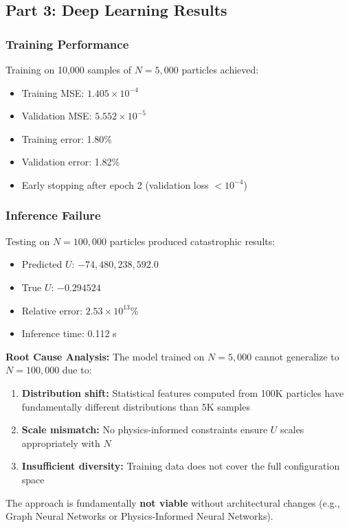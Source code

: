 \documentclass[11pt,a4paper]{article}
\begin{document}
\subsection{Part 3: Deep Learning Results}

\subsubsection{Training Performance}

Training on 10,000 samples of $N=5{,}000$ particles achieved:
\begin{itemize}
\item Training MSE: $1.405 \times 10^{-4}$
\item Validation MSE: $5.552 \times 10^{-5}$
\item Training error: 1.80\%
\item Validation error: 1.82\%
\item Early stopping after epoch 2 (validation loss $< 10^{-4}$)
\end{itemize}

\subsubsection{Inference Failure}

Testing on $N=100{,}000$ particles produced catastrophic results:
\begin{itemize}
\item Predicted $U$: $-74{,}480{,}238{,}592.0$
\item True $U$: $-0.294524$
\item Relative error: $2.53 \times 10^{13}$\%
\item Inference time: 0.112 s
\end{itemize}

\textbf{Root Cause Analysis:} The model trained on $N=5{,}000$ cannot generalize to $N=100{,}000$ due to:
\begin{enumerate}
\item \textbf{Distribution shift:} Statistical features computed from 100K particles have fundamentally different distributions than 5K samples
\item \textbf{Scale mismatch:} No physics-informed constraints ensure $U$ scales appropriately with $N$
\item \textbf{Insufficient diversity:} Training data does not cover the full configuration space
\end{enumerate}

The approach is fundamentally \textbf{not viable} without architectural changes (e.g., Graph Neural Networks or Physics-Informed Neural Networks).
\end{document}

